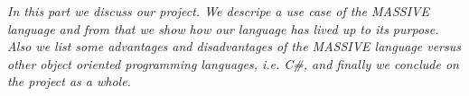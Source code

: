 \textit{In this part we discuss our project. We descripe a use case of the MASSIVE language and from that we show how our language has lived up to its purpose. Also we list some advantages and disadvantages of the MASSIVE language versus other object oriented programming languages, i.e. C\#, and finally we conclude on the project as a whole.}\\ \\